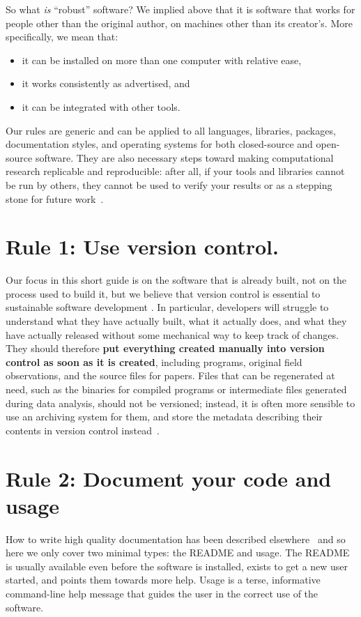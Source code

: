 \documentclass[10pt,letterpaper]{article}
\newcommand{\rulemajor}[1]{\section{#1}}
\newcommand{\ruleminor}[1]{\textbf{#1}}
\begin{document}
So what \emph{is} ``robust'' software?
We implied above that it is software that works for people other than the original author,
on machines other than its creator's.
More specifically, we mean that:

\begin{itemize}
\item
  it can be installed on more than one computer with relative ease,
\item
  it works consistently as advertised, and
\item
  it can be integrated with other tools.
\end{itemize}

Our rules are generic and can be applied to all languages, libraries, packages,
documentation styles, and operating systems for both closed-source and open-source software.  
They are also necessary steps toward making computational research replicable and reproducible:
after all,
if your tools and libraries cannot be run by others,
they cannot be used to verify your results or as a stepping stone for future work~\cite{brown2013}. 

\rulemajor{Rule 1: Use version control.}

Our focus in this short guide is on the software that is already built,
not on the process used to build it,
but we believe that version control is essential to sustainable software development
\cite{wilson2014,wilson2016}.
In particular,
developers will struggle to understand what they have actually built,
what it actually does,
and what they have actually released
without some mechanical way to keep track of changes.
They should therefore
\ruleminor{put everything created manually into version control as soon as it is created},
including programs, original field observations, and the source files for papers.
Files that can be regenerated at need,
such as the binaries for compiled programs or intermediate files generated during data analysis,
should not be versioned;
instead,
it is often more sensible to use an archiving system for them,
and store the metadata describing their contents in version control instead~\cite{noble2009}.

\rulemajor{Rule 2: Document your code and usage}

How to write high quality documentation has been described elsewhere~\cite{karimzadeh2016}
and so here we only cover two minimal types: the README and usage. 
The README is usually available even before the software is installed, 
exists
to get a new user started, and points them towards more
help. Usage is a terse, informative command-line help message that
guides the user in the correct use of the software.
\end{document}
